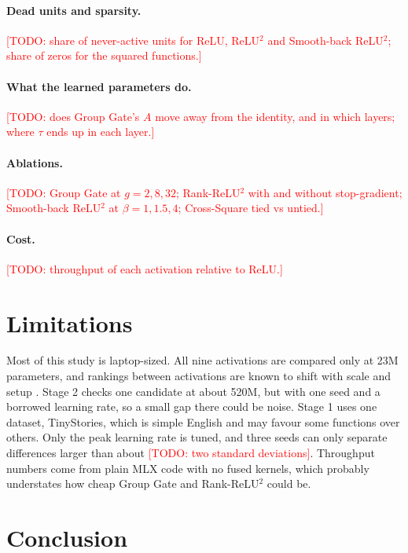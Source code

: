 \documentclass{article}
\newcommand{\todo}[1]{\textcolor{red}{[TODO: #1]}}
\begin{document}
\paragraph{Dead units and sparsity.}
\todo{share of never-active units for ReLU, ReLU$^2$ and Smooth-back ReLU$^2$; share of zeros for the squared functions.}

\paragraph{What the learned parameters do.}
\todo{does Group Gate's $A$ move away from the identity, and in which layers; where $\tau$ ends up in each layer.}

\paragraph{Ablations.}
\todo{Group Gate at $g = 2, 8, 32$; Rank-ReLU$^2$ with and without stop-gradient; Smooth-back ReLU$^2$ at $\beta = 1, 1.5, 4$; Cross-Square tied vs untied.}

\paragraph{Cost.}
\todo{throughput of each activation relative to ReLU.}

\section{Limitations}
\label{sec:limitations}

Most of this study is laptop-sized.
All nine activations are compared only at 23M parameters, and rankings between activations are known to shift with scale and setup \citep{narang2021transfer}.
Stage 2 checks one candidate at about 520M, but with one seed and a borrowed learning rate, so a small gap there could be noise.
Stage 1 uses one dataset, TinyStories, which is simple English and may favour some functions over others.
Only the peak learning rate is tuned, and three seeds can only separate differences larger than about \todo{two standard deviations}.
Throughput numbers come from plain MLX code with no fused kernels, which probably understates how cheap Group Gate and Rank-ReLU$^2$ could be.

\section{Conclusion}
\label{sec:conclusion}
\end{document}

